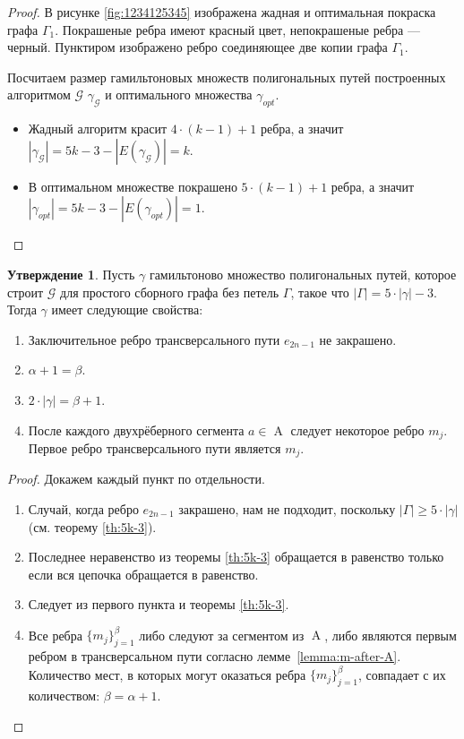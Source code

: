 \documentclass{article}
\theoremstyle{definition}
\newtheorem{conjecture}[theorem]{Утверждение}
\newcommand{\G}{\mathcal{G}}
\newcommand{\A}{\operatorname{A}}
\begin{document}
\begin{proof}
    В рисунке \ref{fig:1234125345} изображена жадная и оптимальная покраска графа $\Gamma_1$. Покрашеные ребра имеют красный цвет, непокрашеные ребра --- черный. Пунктиром изображено ребро соединяющее две копии графа $\Gamma_1$. 

    Посчитаем размер гамильтоновых множеств полигональных путей построенных алгоритмом $\G$ $\gamma_\G$ и оптимального множества $\gamma_{opt}$.

    \begin{itemize}
        \item Жадный алгоритм красит $4 \cdot (k - 1) + 1$ ребра, а значит $|\gamma_\G| = 5k - 3 - |E(\gamma_{\G})| = k$.
        \item В оптимальном множестве покрашено $5 \cdot (k - 1) + 1$ ребра, а значит $|\gamma_{opt}| = 5k - 3 - |E(\gamma_{opt})| = 1$.
    \end{itemize}
\end{proof}


\begin{conjecture}\label{conj:G-properties}
    Пусть $\gamma$ гамильтоново множество полигональных путей, которое строит $\G$ для простого сборного графа без петель $\Gamma$, такое что $|\Gamma| = 5 \cdot |\gamma| - 3$. Тогда $\gamma$ имеет следующие свойства:

    \begin{enumerate}
        \item Заключительное ребро трансверсального пути $e_{2n - 1}$ не закрашено.
        \item $\alpha + 1 = \beta$.
        \item $2\cdot |\gamma| = \beta + 1$.
        \item После каждого двухрёберного сегмента $a \in \A$ следует некоторое ребро $m_j$. Первое ребро трансверсального пути является $m_j$.
    \end{enumerate}
\end{conjecture}

\begin{proof}
    Докажем каждый пункт по отдельности.
    \begin{enumerate}
        \item Случай, когда ребро $e_{2n - 1}$ закрашено, нам не подходит, поскольку $|\Gamma| \geq 5 \cdot |\gamma|$ (см. теорему \ref{th:5k-3}).
        \item Последнее неравенство из теоремы \ref{th:5k-3} обращается в равенство только если вся цепочка обращается в равенство.
        \item Следует из первого пункта и теоремы \ref{th:5k-3}.
        \item Все ребра $\{m_j\}_{j=1}^\beta$ либо следуют за сегментом из $\A$, либо являются первым ребром в трансверсальном пути согласно лемме~\ref{lemma:m-after-A}. Количество мест, в которых могут оказаться ребра $\{m_j\}_{j=1}^\beta$, совпадает с их количеством: $\beta = \alpha + 1$. 
    \end{enumerate}
\end{proof}
\end{document}
